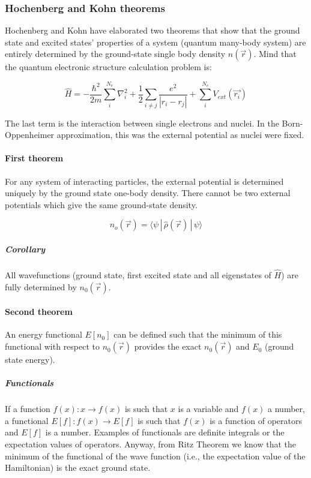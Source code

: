 		\subsubsection{Hochenberg and Kohn theorems}
		Hochenberg and Kohn have elaborated two theorems that show that the ground state and excited states' properties of a system (quantum many-body system) are entirely determined by the ground-state single body density $n(\vec{r})$.
		Mind that the quantum electronic structure calculation problem is:

		$$\hat{H}=-\frac{\hbar^2}{2m}\sum_i^{N_e}\nabla_i^2+\frac{1}{2}\sum_{i\neq j} \frac{e^2}{|r_i-r_j|}+\sum_i^{N_e}V_{ext}(\vec{r_i})$$

		The last term is the interaction between single electrons and nuclei.
		In the Born-Oppenheimer approximation, this was the external potential as nuclei were fixed.

			\paragraph{First theorem}
			For any system of interacting particles, the external potential is determined uniquely by the ground state one-body density.
			There cannot be two  external potentials which give the same ground-state density.

			$$n_o(\vec{r})=\langle \psi\,|\,\hat{\rho}(\vec{r})\,|\,\psi \rangle$$

				\subparagraph{Corollary}
				All wavefunctions (ground state, first excited state and all eigenstates of $\hat{H}$) are fully determined by $n_0(\vec{r})$.

			\paragraph{Second theorem}
			An energy functional $E[n_0]$ can be defined such that the minimum of this functional with respect to $n_0(\vec{r})$ provides the exact $n_0(\vec{r})$ and $E_0$ (ground state energy).

				\subparagraph{Functionals}
				If a function $f(x):x\rightarrow f(x)$ is such that $x$ is a variable and $f(x)$ a number, a functional $E[f]:f(x)\rightarrow E[f]$ is such that $f(x)$ is a function of operators and $E[f]$ is a number.
				Examples of functionals are definite integrals or the expectation values of operators.
				Anyway, from Ritz Theorem we know that the minimum of the functional of the wave function (i.e., the expectation value of the Hamiltonian) is the exact ground state.

